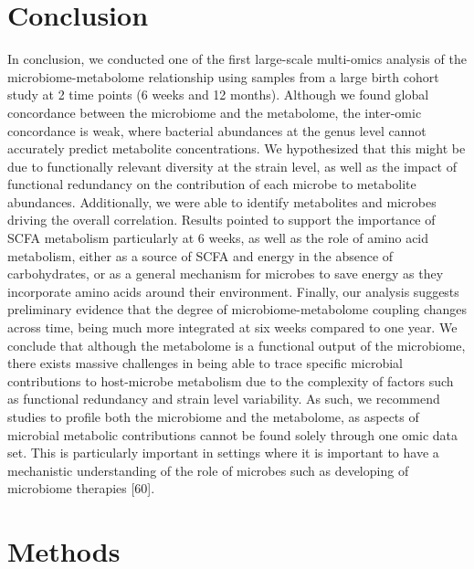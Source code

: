 \section{Conclusion}
In conclusion, we conducted one of the first large-scale multi-omics analysis of the microbiome-metabolome relationship using samples from a large birth cohort study at 2 time points (6 weeks and 12 months). Although we found global concordance between the microbiome and the metabolome, the inter-omic concordance is weak, where bacterial abundances at the genus level cannot accurately predict metabolite concentrations. We hypothesized that this might be due to functionally relevant diversity at the strain level, as well as the impact of functional redundancy on the contribution of each microbe to metabolite abundances. Additionally, we were able to identify metabolites and microbes driving the overall correlation. Results pointed to support the importance of SCFA metabolism particularly at 6 weeks, as well as the role of amino acid metabolism, either as a source of SCFA and energy in the absence of carbohydrates, or as a general mechanism for microbes to save energy as they incorporate amino acids around their environment. Finally, our analysis suggests preliminary evidence that the degree of microbiome-metabolome coupling changes across time, being much more integrated at six weeks compared to one year.  
We conclude that although the metabolome is a functional output of the microbiome, there exists massive challenges in being able to trace specific microbial contributions to host-microbe metabolism due to the complexity of factors such as functional redundancy and strain level variability. As such, we recommend studies to profile both the microbiome and the metabolome, as aspects of microbial metabolic contributions cannot be found solely through one omic data set. This is particularly important in settings where it is important to have a mechanistic understanding of the role of microbes such as developing of microbiome therapies [60].   
\section{Methods}
